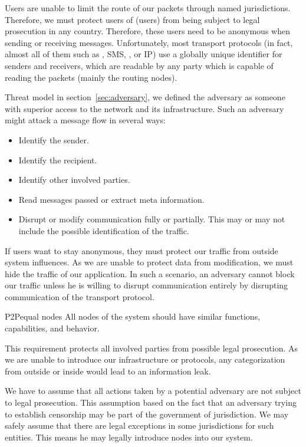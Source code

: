 Users are unable to limit the route of our packets through named jurisdictions. Therefore, we must protect users of \MessageVortex (users) from being subject to legal prosecution in any country. Therefore, these users need to be anonymous when sending or receiving messages. Unfortunately, most transport protocols (in fact, almost all of them such as , SMS, , or IP) use a globally unique identifier for senders and receivers, which are readable by any party which is capable of reading the packets (mainly the routing nodes).  

Threat model in section~\ref{sec:adversary}, we defined the adversary as someone with superior access to the network and its infrastructure. Such an adversary might attack a message flow in several ways:
\begin{itemize}
	\item Identify the sender.
	\item Identify the recipient.
	\item Identify other involved parties.
	\item Read messages passed or extract meta information.
	\item Disrupt or modify communication fully or partially. This may or may not include the possible identification of the traffic.
\end{itemize}

If users want to stay anonymous, they must protect our traffic from outside system influences. As we are unable to protect data from modification, we must hide the traffic of our application. In such a scenario, an adversary cannot block our traffic unless he is willing to disrupt communication entirely by disrupting communication of the transport protocol. 

\begin{requirement}{P2P}{equal nodes}
	All nodes of the system should have similar functions, capabilities, and behavior.
\end{requirement}

This requirement protects all involved parties from possible legal prosecution. As we are unable to introduce our infrastructure or protocols, any categorization from outside or inside would lead to an information leak. 

We have to assume that all actions taken by a potential adversary are not subject to legal prosecution. This assumption based on the fact that an adversary trying to establish censorship may be part of the government of jurisdiction. We may safely assume that there are legal exceptions in some jurisdictions for such entities. This means he may legally introduce nodes into our system.


